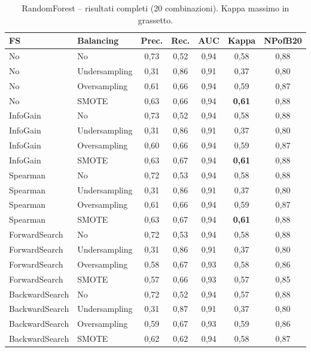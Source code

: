 \begin{table}[h!]
\centering
\small
\begin{tabular}{@{}llccccc@{}}
\toprule
\textbf{FS} & \textbf{Balancing} & \textbf{Prec.} & \textbf{Rec.} &
\textbf{AUC} & \textbf{Kappa} & \textbf{NPofB20} \\
\midrule
No             & No            & 0,73 & 0,52 & 0,94 & 0,58 & 0,88 \\
No             & Undersampling & 0,31 & 0,86 & 0,91 & 0,37 & 0,80 \\
No             & Oversampling  & 0,61 & 0,66 & 0,94 & 0,59 & 0,87 \\
No             & SMOTE         & 0,63 & 0,66 & 0,94 & \textbf{0,61} & 0,88 \\
InfoGain       & No            & 0,73 & 0,52 & 0,94 & 0,58 & 0,88 \\
InfoGain       & Undersampling & 0,31 & 0,86 & 0,91 & 0,37 & 0,80 \\
InfoGain       & Oversampling  & 0,60 & 0,66 & 0,94 & 0,59 & 0,87 \\
InfoGain       & SMOTE         & 0,63 & 0,67 & 0,94 & \textbf{0,61} & 0,88 \\
Spearman       & No            & 0,72 & 0,53 & 0,94 & 0,58 & 0,88 \\
Spearman       & Undersampling & 0,31 & 0,86 & 0,91 & 0,37 & 0,80 \\
Spearman       & Oversampling  & 0,61 & 0,66 & 0,94 & 0,59 & 0,87 \\
Spearman       & SMOTE         & 0,63 & 0,67 & 0,94 & \textbf{0,61} & 0,88 \\
ForwardSearch  & No            & 0,72 & 0,53 & 0,94 & 0,58 & 0,88 \\
ForwardSearch  & Undersampling & 0,31 & 0,86 & 0,91 & 0,37 & 0,80 \\
ForwardSearch  & Oversampling  & 0,58 & 0,67 & 0,93 & 0,58 & 0,86 \\
ForwardSearch  & SMOTE         & 0,57 & 0,66 & 0,93 & 0,57 & 0,85 \\
BackwardSearch & No            & 0,72 & 0,52 & 0,94 & 0,57 & 0,88 \\
BackwardSearch & Undersampling & 0,31 & 0,87 & 0,91 & 0,37 & 0,80 \\
BackwardSearch & Oversampling  & 0,59 & 0,67 & 0,93 & 0,59 & 0,86 \\
BackwardSearch & SMOTE         & 0,62 & 0,62 & 0,94 & 0,58 & 0,87 \\
\bottomrule
\end{tabular}
\caption{RandomForest -- risultati completi (20 combinazioni). Kappa massimo in grassetto.}
\label{tab:rf-full}
\end{table}

